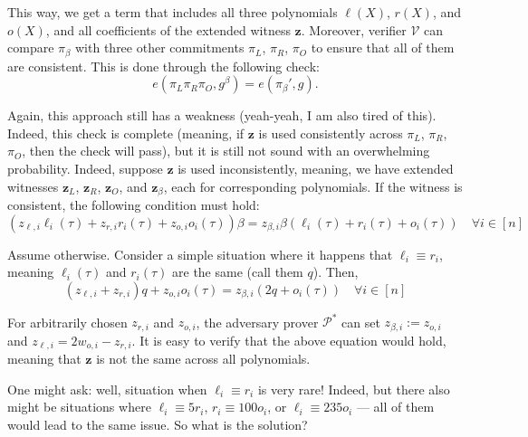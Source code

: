 \documentclass[../lecture-notes-148x210.tex]{subfiles}
\begin{document}
This way, we get a term that includes all three polynomials $\ell(X)$, $r(X)$, and $o(X)$, and all coefficients of the extended witness $\mathbf{z}$. Moreover, verifier $\mathcal{V}$ can compare $\pi_{\beta}$ with three other commitments $\pi_L$, $\pi_R$, $\pi_O$ to ensure that all of them are consistent. This is done through the following check:
\begin{equation*}
    e(\pi_L\pi_R\pi_O, g^{\beta}) = e(\pi_{\beta}', g).
\end{equation*}

Again, this approach still has a weakness (yeah-yeah, I am also tired of this). Indeed, this check is complete (meaning, if $\mathbf{z}$ is used consistently across $\pi_L$, $\pi_R$, $\pi_O$, then the check will pass), but it is still not sound with an overwhelming probability. Indeed, suppose $\mathbf{z}$ is used inconsistently, meaning, we have extended witnesses $\mathbf{z}_L$, $\mathbf{z}_R$, $\mathbf{z}_O$, and $\mathbf{z}_{\beta}$, each for corresponding polynomials. If the witness is consistent, the following condition must hold:
\begin{equation*}
    (z_{\ell,i}\ell_i(\tau) + z_{r,i}r_i(\tau) + z_{o,i}o_i(\tau))\beta = z_{\beta,i}\beta(\ell_i(\tau) + r_i(\tau) + o_i(\tau)) \quad \forall i \in [n]
\end{equation*}

Assume otherwise. Consider a simple situation where it happens that $\ell_i \equiv r_i$, meaning $\ell_i(\tau)$ and $r_i(\tau)$ are the same (call them $q$). Then,
\begin{equation*}
    (z_{\ell,i} + z_{r,i})q + z_{o,i}o_i(\tau)= z_{\beta,i}(2q + o_i(\tau)) \quad \forall i \in [n]
\end{equation*}

For arbitrarily chosen $z_{r,i}$ and $z_{o,i}$, the adversary prover $\mathcal{P}^*$ can set $z_{\beta,i} := z_{o,i}$ and $z_{\ell,i}=2w_{o,i} - z_{r,i}$. It is easy to verify that the above equation would hold, meaning that $\mathbf{z}$ is not the same across all polynomials. 

One might ask: well, situation when $\ell_i \equiv r_i$ is very rare! Indeed, but there also might be situations where $\ell_i \equiv 5r_i$, $r_i \equiv 100o_i$, or $\ell_i \equiv 235o_i$ --- all of them would lead to the same issue. So what is the solution? 
\end{document}
